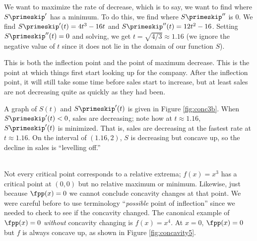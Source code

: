 {We want to maximize the rate of decrease, which is to say, we want to find where $S\primeskip'$ has a minimum.  To do this, we find where $S\primeskip''$ is 0.  We find $S\primeskip'(t)=4t^3-16t$ and $S\primeskip''(t)=12t^2-16$.  Setting $S\primeskip''(t)=0$ and solving, we get $t=\sqrt{4/3}\approx 1.16$ (we ignore the negative value of $t$ since it does not lie in the domain of our function $S$).

This is both the inflection point and the point of maximum decrease.  This is the point at which things first start looking up for the company.  After the inflection point, it will still take some time before sales start to increase, but at least sales are not decreasing quite as quickly as they had been.

A graph of $S(t)$ and $S\primeskip'(t)$ is given in Figure \ref{fig:conc3b}. When $S\primeskip'(t)<0$, sales are decreasing; note how at $t\approx 1.16$, $S\primeskip'(t)$ is minimized. That is, sales are decreasing at the fastest rate at $t\approx 1.16$.  On the interval of $(1.16,2)$, $S$ is decreasing but concave up, so the decline in sales is ``levelling off.''
}\\



Not every critical point corresponds to a relative extrema; $f(x)=x^3$ has a critical point at $(0,0)$ but no relative maximum or minimum. Likewise, just because $\fpp(x)=0$ we cannot conclude concavity changes at that point. We were careful before to use terminology ``\textit{possible} point of inflection'' since we needed to check to see if the concavity changed. The canonical example of $\fpp(x)=0$ \textit{without} concavity changing is $f(x)=x^4$. At $x=0$, $\fpp(x)=0$ but $f$ is always concave up, as shown in Figure \ref{fig:concavity5}.\\


